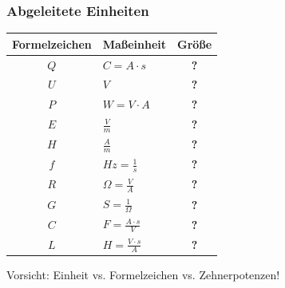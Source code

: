 \begin{frame}
    \frametitle{Abgeleitete Einheiten}

    \begin{center}
    \footnotesize
    \renewcommand{\arraystretch}{1.5}
    \begin{tabular}{|c|l|c|}\hline
        \textbf{Formelzeichen} & \textbf{Maßeinheit} & \textbf{Größe} \\ \hline \hline
        $Q$ & $C = A\cdot s$            & \textbf{?} \\ \hline
        $U$ & $V$                       & \textbf{?} \\ \hline
        $P$ & $W = V\cdot A$            & \textbf{?} \\ \hline
        $E$ & $\frac{V}{m}$             & \textbf{?} \\ \hline
        $H$ & $\frac{A}{m}$             & \textbf{?} \\ \hline
        $f$ & $Hz = \frac{1}{s}$        & \textbf{?} \\ \hline
        $R$ & $\Omega = \frac{V}{A}$    & \textbf{?} \\ \hline
        $G$ & $S = \frac{1}{\Omega}$    & \textbf{?} \\ \hline
        $C$ & $F = \frac{A\cdot s}{V}$  & \textbf{?} \\ \hline
        $L$ & $H = \frac{V\cdot s}{A}$  & \textbf{?} \\ \hline
    \end{tabular}
    \end{center}

    Vorsicht: Einheit vs. Formelzeichen vs. Zehnerpotenzen!

\end{frame}

